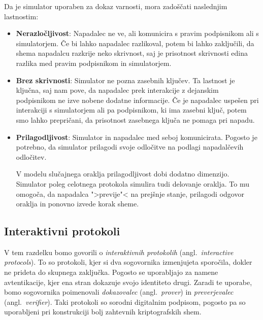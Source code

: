 \documentclass[isrm2, tisk]{fmfdelo}
\begin{document}
Da je simulator uporaben za dokaz varnosti, mora zadoščati naslednjim lastnostim:
\begin{itemize}
    \item \textbf{Nerazločljivost}: Napadalec ne ve, ali komunicira s pravim podpisnikom ali s
        simulatorjem. Če bi lahko napadalec razlikoval, potem bi lahko zaključili, da shema napadalcu
        razkrije neko skrivnost, saj je prisotnost skrivnosti edina razlika med pravim podpisnikom in
        simulatorjem.
    \item \textbf{Brez skrivnosti}: Simulator ne pozna zasebnih ključev. Ta lastnost je ključna, saj
        nam pove, da napadalec prek interakcije z dejanskim podpisnikom ne izve nobene dodatne informacije.
        Če je napadalec uspešen pri interakciji s simulatorjem ali pa podpisnikom, ki ima zasebni
        ključ, potem smo lahko prepričani, da prisotnost zasebnega ključa ne pomaga pri napadu.
    \item \textbf{Prilagodljivost}: Simulator in napadalec med seboj komunicirata. Pogosto je potrebno,
        da simulator prilagodi svoje odločitve na podlagi napadalčevih odločitev.

        V modelu slučajnega oraklja prilagodljivost dobi dodatno dimenzijo. Simulator poleg
        celotnega protokola simulira tudi delovanje oraklja. To mu omogoča, da napadalca ">previje"<
        na prejšnje stanje, prilagodi odgovor oraklja in ponovno izvede korak sheme.
\end{itemize}

\subsection{Interaktivni protokoli}
V tem razdelku bomo govorili o \textit{interaktivnih protokolih} (angl.\ \textit{interactive protocols}).
To so protokoli, kjer si dva sogovornika izmenjujeta sporočila, dokler ne prideta do skupnega zaključka.
Pogosto se uporabljajo za namene avtentikacije, kjer ena stran dokazuje svojo identiteto drugi.
Zaradi te uporabe, bomo sogovornika poimenovali \textit{dokazovalec} (angl.\ \textit{prover}) in
\textit{preverjevalec} (angl.\ \textit{verifier}). Taki protokoli so sorodni digitalnim podpisom,
pogosto pa so uporabljeni pri konstrukciji bolj zahtevnih kriptografskih shem.
\end{document}
